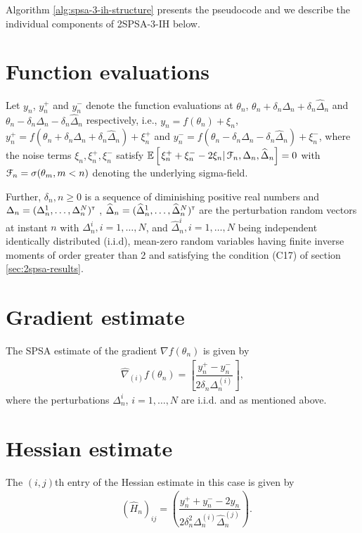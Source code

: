 Algorithm \ref{alg:spsa-3-ih-structure} presents the pseudocode and we describe the individual components of 2SPSA-3-IH below.
\section{Function evaluations}
Let $y_n$, $y_n^+$ and $y_n^-$ denote the function evaluations at $\theta_n$, $\theta_n+\delta_n \Delta_n+\delta_n \widehat \Delta_n$ and $\theta_n -\delta_n\Delta_n-\delta_n\widehat\Delta_n$ respectively, i.e., 
$y_n = f(\theta_n) + \xi_n$, $y_n^+ = f(\theta_n+\delta_n \Delta_n +\delta_n \widehat\Delta_n) + \xi_n^+$ and 
$y_n^- = f(\theta_n -\delta_n\Delta_n-\delta_n\widehat\Delta_n) + \xi_n^-$,
where the noise terms $\xi_n, \xi_n^+, \xi_n^-$ satisfy $\mathbb{E}\left[\left.\xi_n^+ + \xi_n^- - 2\xi_n \right| \mathcal{F}_n, \Delta_n, \widehat \Delta_n\right] = 0$ with $\mathcal{F}_n = \sigma(\theta_m,m <  n)$ denoting the underlying sigma-field.

Further, $\delta_n, n\geq 0$ is a sequence of diminishing positive real numbers and 
$\Delta_n = (\Delta_n^1,\ldots,\Delta_n^N)^\mathsf{\scriptscriptstyle T}$ , $\widehat\Delta_n = (\widehat\Delta_n^1,\ldots,\widehat\Delta_n^N)^\mathsf{\scriptscriptstyle T}$ are the perturbation random vectors at instant $n$ with $\Delta_n^i,i=1,\ldots,N$, and $\widehat\Delta_n^i,i=1,\ldots,N$ being independent identically distributed (i.i.d), mean-zero random variables having finite inverse moments of order greater than 2 and satisfying the condition (C17) of section \ref{sec:2spsa-results}.  

\section{Gradient estimate}
The SPSA estimate of the gradient $\nabla f(\theta_n)$ is given by
\begin{align}
\label{eq:grad-spsa}
\widehat\nabla_{(i)} f(\theta_n) =  \left[ \dfrac{y_n^+ - y_n^-}{2\delta_n \Delta_n^{(i)}}\right],
\end{align}
where the perturbations $\Delta_n^i$, $i=1,\ldots,N$ are i.i.d. and as mentioned above.


\section{Hessian estimate}
The $(i,j)$th entry of the Hessian estimate in this case is given by
\begin{align}
\label{eq:2spsa-ber}
&\left(\widehat H_n\right)_{ij} =  \left(\dfrac{y_n^+ + y_n^- - 2 y_n}{2\delta_n^2 \Delta_n^{(i)} \widehat \Delta_n^{(j)}}\right).
\end{align}
